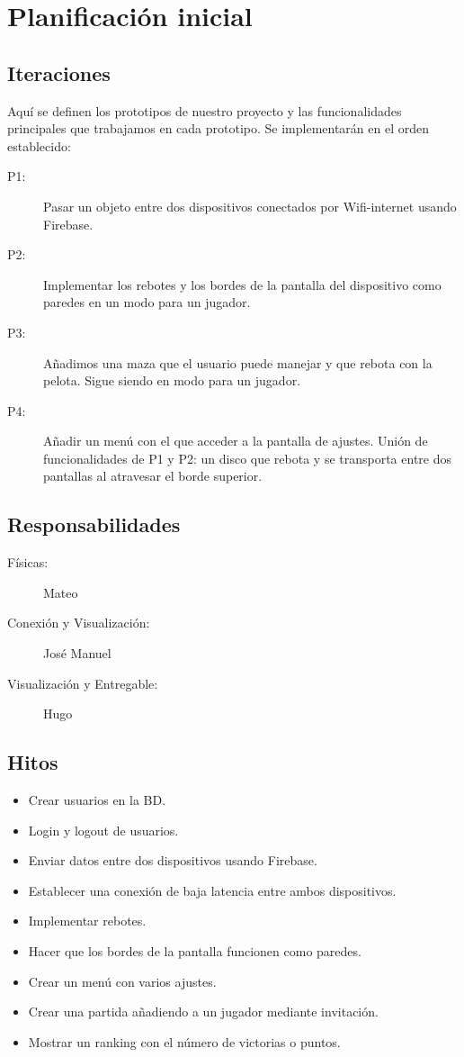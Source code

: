 \documentclass[a4paper,openright,12pt]{article}
\begin{document}
\section{Planificación inicial}

\subsection{Iteraciones}
Aquí se definen los prototipos de nuestro proyecto y las funcionalidades principales que trabajamos en cada prototipo. Se implementarán en el orden establecido:
\begin{description}
\item[P1:] Pasar un objeto entre dos dispositivos conectados por Wifi-internet usando Firebase.
\item[P2:] Implementar los rebotes y los bordes de la pantalla del dispositivo como paredes en un modo para un jugador.
\item[P3:] Añadimos una maza que el usuario puede manejar y que rebota con la pelota. Sigue siendo en modo para un jugador.
\item[P4:] Añadir un menú con el que acceder a la pantalla de ajustes. Unión de funcionalidades de P1 y P2: un disco que rebota y se transporta entre dos pantallas al atravesar el borde superior. 
\end{description}
\subsection{Responsabilidades}
\begin{description}

\item[Físicas:] Mateo 
\item[Conexión y Visualización:] José Manuel
\item[Visualización y Entregable:] Hugo
\end{description}

\subsection{Hitos}
\begin{itemize}
\item Crear usuarios en la BD.
\item Login y logout de usuarios.
\item Enviar datos entre dos dispositivos usando Firebase.
\item Establecer una conexión de baja latencia entre ambos dispositivos.
\item Implementar rebotes.
\item Hacer que los bordes de la pantalla funcionen como paredes.
\item Crear un menú con varios ajustes.
\item Crear una partida añadiendo a un jugador mediante invitación.
\item Mostrar un ranking con el número de victorias o puntos.
\end{itemize}
\end{document}
